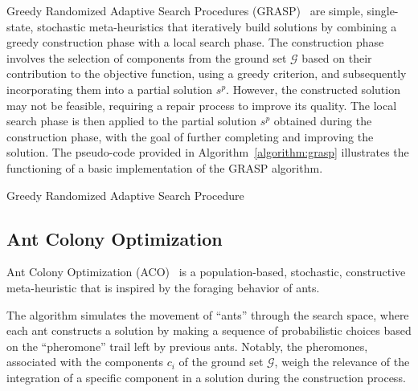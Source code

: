 Greedy Randomized Adaptive Search Procedures
(GRASP)~\cite{resende2010greedya,outeiro2021application,blummetaheuristics} are
simple, single-state, stochastic meta-heuristics that iteratively build solutions by
combining a greedy construction phase with a local search phase. The
construction phase involves the selection of components from the ground set
$\mathcal{G}$ based on their contribution to the objective function, using a
greedy criterion, and subsequently incorporating them into a partial solution
$s^{p}$. However, the constructed solution may not be feasible, requiring a
repair process to improve its quality. The local search phase is then applied to
the partial solution $s^{p}$ obtained during the construction phase, with the
goal of further completing and improving the solution. The pseudo-code provided
in Algorithm~\ref{algorithm:grasp} illustrates the functioning of a basic
implementation of the GRASP algorithm.

\begin{algorithm}[htb!]
    \DontPrintSemicolon
    \caption{Greedy Randomized Adaptive Search Procedure}
    \label{algorithm:grasp}
\end{algorithm}


\subsection{Ant Colony Optimization}

Ant Colony Optimization (ACO)~\cite{dorigo2010anta,outeiro2021application,
    luke2013essentialsa,blummetaheuristics} is a population-based, stochastic,
constructive meta-heuristic that is inspired by the foraging behavior of ants.

The algorithm simulates the movement of ``ants'' through the search space, where
each ant constructs a solution by making a sequence of probabilistic choices
based on the ``pheromone'' trail left by previous ants. Notably, the pheromones,
associated with the components $c_{i}$ of the ground set $\mathcal{G}$, weigh
the relevance of the integration of a specific component in a solution during
the construction process.

